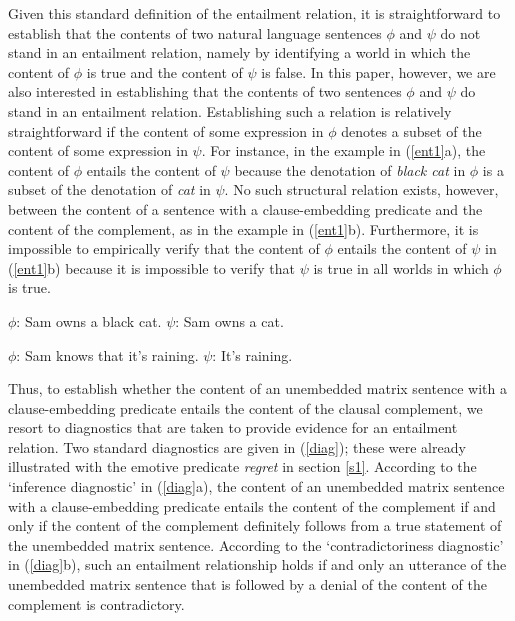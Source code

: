 \documentclass[11pt,fleqn]{article}
\newcommand{\6}{\mbox{$[\hspace*{-.6mm}[$}}
\newcommand{\9}{\mbox{$]\hspace*{-.6mm}]$}}
\begin{document}
Given this standard definition of the entailment relation, it is straightforward to establish that the contents of two natural language sentences $\phi$ and $\psi$ do not stand in an entailment relation, namely by identifying a world in which the content of $\phi$ is true and the content of $\psi$ is false. In this paper, however, we are also interested in establishing that the contents of two sentences $\phi$ and $\psi$  do stand in an entailment relation. Establishing such a relation is relatively straightforward if the content of some expression in $\phi$ denotes a subset of the content of some expression in $\psi$. For instance, in the example in (\ref{ent1}a),  the content of $\phi$ entails the content of $\psi$ because the denotation of {\em black cat} in $\phi$ is a subset of the denotation of {\em cat} in $\psi$. No such structural relation exists, however, between the content of a sentence with a clause-embedding predicate and the content of the complement, as in the example in (\ref{ent1}b). Furthermore, it is impossible to empirically verify that the content of $\phi$ entails the content of $\psi$ in (\ref{ent1}b) because it is impossible to verify that $\psi$ is true in all worlds in which $\phi$ is true. 

\begin{exe}
\ex\label{ent1}
\begin{xlist}
\ex $\phi$: Sam owns a black cat. \hspace*{1.5cm} $\psi$: Sam owns a cat.

\ex $\phi$: Sam knows that it's raining. \hspace*{.6cm} $\psi$: It's raining.

\end{xlist}
\end{exe}

Thus, to establish whether the content of an unembedded matrix sentence with a clause-embedding predicate entails the content of the clausal complement, we resort to diagnostics that are taken to provide evidence for an entailment relation. Two standard diagnostics are given in (\ref{diag}); these were already illustrated with the emotive predicate {\em regret} in section \ref{s1}. According to the `inference diagnostic' in (\ref{diag}a), the content of an unembedded matrix sentence with a clause-embedding predicate entails the content of the complement if and only if the content of the complement definitely follows from a true statement of the unembedded matrix sentence. According to the `contradictoriness diagnostic' in (\ref{diag}b), such an entailment relationship holds if and only an utterance of the unembedded matrix sentence that is followed by a denial of the content of the complement is contradictory. 
\end{document}

